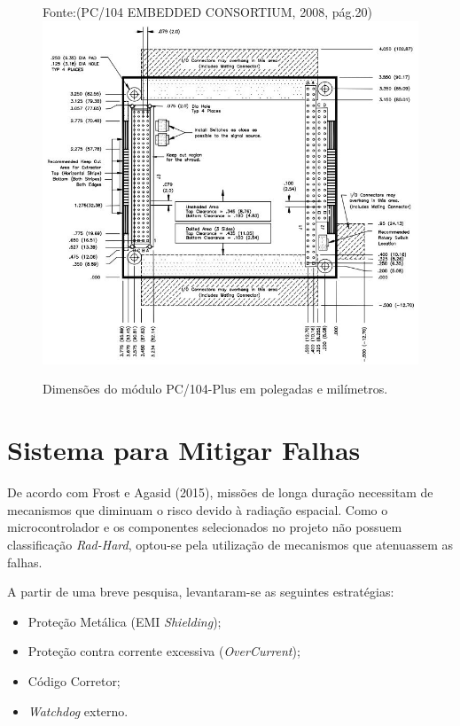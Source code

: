 \begin{figure}[h]
	\centering
	Fonte:(PC/104 EMBEDDED CONSORTIUM, 2008, pág.20)	
	\includegraphics[keepaspectratio=true,scale=0.7]{figuras/pc104_32bit.PNG}
	\caption{Dimensões do módulo PC/104-Plus em polegadas e milímetros.}
	\label{pc104}
\end{figure}
\FloatBarrier
\section{Sistema para Mitigar Falhas}

De acordo com  Frost e Agasid (2015), missões de longa duração necessitam de mecanismos que diminuam o risco devido à radiação espacial. Como o microcontrolador e os componentes selecionados no projeto não possuem classificação \textit{Rad-Hard}, optou-se pela utilização de mecanismos que atenuassem as falhas. 

A partir de uma breve pesquisa, levantaram-se as seguintes estratégias:
\begin{itemize}
	\item Proteção Metálica (EMI \textit{Shielding});
	\item Proteção contra corrente excessiva (\textit{OverCurrent});
	\item Código Corretor;
	\item \textit{Watchdog} externo.
\end{itemize}

